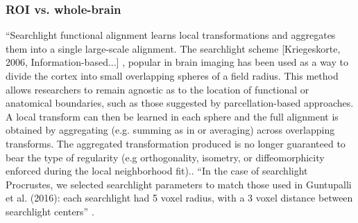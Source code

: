 \begin{comment}

\paragraph{SRM and individual differences}
%
``SRM can be used to isolate participant-unique responses by examining the
residuals after removing shared group responses, or it can be applied
hierarchically to the residuals to identify subgroups [\citet{chen2017shared}]
'' \citep{cohen2017computational}.
%
``Recognizing that signal exists beyond the average or shared response of a
group, such studies exploit idiosyncratic but stable responses to account for
previously unexplained variance in brain function, behavioral performance and
clinical measures [e.g., Finn (2015). Functional fingerprinting (based on
connectivity)]'' \citep{cohen2017computational}.
%
``In cases where each subject's unique response is of more interest than the
shared signal, SRM can be used to factor out the shared component thereby
isolating the idiosyncratic response for each subject
[\citep{chen2015reduced}]'' \citep{kumar2020brainiak}.

\end{comment}




\subsubsection{ROI vs. whole-brain}


``Searchlight functional alignment \citep{zhang2016searchlight,
guntupalli2016model} learns local transformations and aggregates them into a
single large-scale alignment.
%
The searchlight scheme [Kriegeskorte, 2006, Information-based...] , popular in
brain imaging \citep{guntupalli2018computational, guntupalli2016model} has been
used as a way to divide the cortex into small overlapping spheres of a field
radius.
%
This method allows researchers to remain agnostic as to the location of
functional or anatomical boundaries, such as those suggested by
parcellation-based approaches.
%
A local transform can then be learned in each sphere and the full alignment is
obtained by aggregating (e.g. summing as in \citep{guntupalli2016model} or
averaging) across overlapping transforms.
%
The aggregated transformation produced is no longer guaranteed to bear the type
of regularity (e.g orthogonality, isometry, or diffeomorphicity enforced during
the local neighborhood fit)..
%
``In the case of searchlight Procrustes, we selected searchlight parameters to
match those used in Guntupalli et al. (2016):
%
each searchlight had 5 voxel radius, with a 3 voxel distance between searchlight
centers'' \citep{bazeille2021empirical}.


